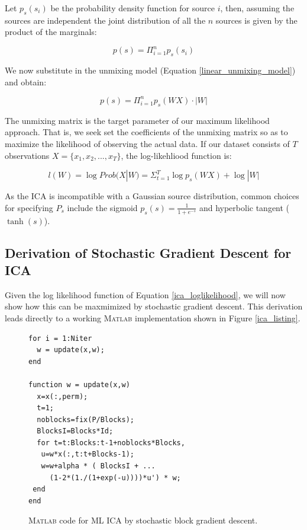 \documentclass[11pt, oneside, a4paper]{report}
\begin{document}
Let $p_s(s_i)$ be the probability density function for source $i$, then, assuming the sources are independent the joint distribution of all the $n$ sources is given by the product of the marginals:

\begin{equation}
  p(s) = \Pi_{i=1}^n p_s(s_i)
\end{equation}

We now substitute in the unmixing model (Equation \ref{linear_unmixing_model}) and obtain:

\begin{equation}
  p(s) = \Pi_{i=1}^n p_s(WX) \cdot |W|
\end{equation}

The unmixing matrix is the target parameter of our maximum likelihood approach. That is, we seek set the coefficients of the unmixing matrix so as to maximize the likelihood of observing the actual data. If our dataset consists of $T$ observations $X = \{x_1,x_2,...,x_T\}$, the log-likehliood function is:

\begin{equation}\label{ica_loglikelihood}
  l(W) =\log Prob(X|W)= \Sigma_{t=1}^T \log p_s(WX)+\log |W|
\end{equation}

As the ICA is incompatible with a Gaussian source distribution, common choices for specifying $P_s$ include the sigmoid $p_s(s) = \frac{1}{1+e^{-s}}$ and hyperbolic tangent ($\tanh(s)$).

\subsection{Derivation of Stochastic Gradient Descent for ICA}

Given the log likelihood function of Equation \ref{ica_loglikelihood},
we will now show how this can be maxmimized by stochastic gradient
descent. This derivation leads directly to a working \textsc{Matlab}
implementation shown in Figure \ref{ica_listing}.


\begin{figure}[!htpb]\label{ica_listing}
  \begin{lstlisting}[frame=single]
for i = 1:Niter
  w = update(x,w);
end

function w = update(x,w)
  x=x(:,perm);
  t=1;
  noblocks=fix(P/Blocks);
  BlocksI=Blocks*Id;
  for t=t:Blocks:t-1+noblocks*Blocks,
   u=w*x(:,t:t+Blocks-1); 
   w=w+alpha * ( BlocksI + ...
     (1-2*(1./(1+exp(-u))))*u') * w;
 end
end
  \end{lstlisting}
  \caption{\textsc{Matlab} code for ML ICA by stochastic block gradient descent.}
  \label{mlica_code}
\end{figure}
\end{document}
